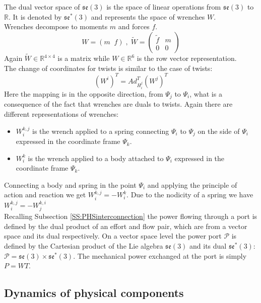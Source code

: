 \documentclass[a4paper,twoside, openright,12pt]{report}
\begin{document}
The  dual vector space of $\mathfrak{se}(3)$ is the space of linear operations from $\mathfrak{se}(3)$ to $\mathbb{R} $. It is denoted by $\mathfrak{se}^*(3)$ and represents the space of wrenches $W$.\\ Wrenches decompose to moments $ m $ and forces $ f $.
\[ W = ( m \;\; f) \; , \; \tilde{W} = \begin{pmatrix}
\tilde{f} & m \\ 0 & 0\end{pmatrix} \]
Again $\tilde{W} \in \mathbb{R}^{4\times 4}$ is a matrix while $W \in \mathbb{R}^6$ is the  row vector representation.\\ 
The change of coordinates for twists is similar to the case of twists:
\[(W^i)^T = Ad_{H_i^j}^T (W^j)^T \]
Here the mapping is in the opposite direction, from $\Psi_j$ to $\Psi_i$, what is a consequence of the fact that wrenches are duals to twists. Again there are different representations of wrenches: \begin{itemize}
\item $W_i^{k,j}$ is the wrench applied to a spring connecting $\Psi_i$ to $\Psi_j$ on the side of $\Psi_i$ expressed in the coordinate frame $\Psi_k$.
\item $W_i^k $ is the wrench applied to a body attached to $\Psi_i$ expressed in the coordinate frame $\Psi_k$.
\end{itemize}
Connecting a body and spring in the point $\Psi_i$ and applying the principle of action and reaction we get $W_i^{k,j} = -W_i^k$. Due to the nodicity of a spring we have $ W_i^{k,j} = -W_j^{k,i} $\\

Recalling Subsection \ref{SS:PHSinterconnection} the power flowing through a port is defined by the dual product of an effort and flow pair, which are from a vector space and its dual respectively. On a vector space level the power port $\mathcal{P}$ is defined by the Cartesian product of the Lie algebra $\mathfrak{se}(3)$ and its dual $\mathfrak{se}^*(3)$: $\mathcal{P} = \mathfrak{se}(3) \times \mathfrak{se}^*(3)$. The mechanical power exchanged at the port is simply $P = WT$.


\subsection{Dynamics of physical components}
\end{document}
